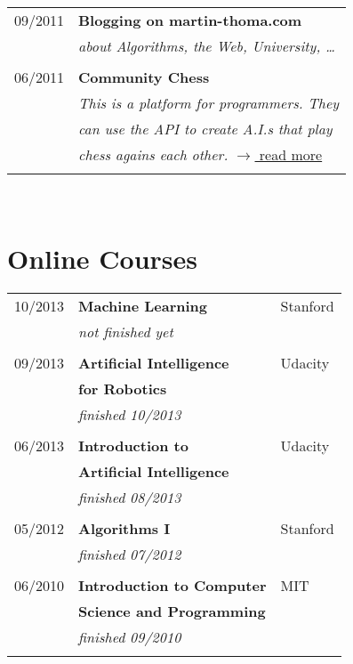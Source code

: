 \documentclass[a4paper,10pt]{article} %
\begin{document}
{\begin{minipage}[t]{0.44\textwidth}
\begin{tabular}{rl}
09/2011	 & \textbf{Blogging on martin-thoma.com}\\
& \textit{about Algorithms, the Web, University, \dots}\\ \\


06/2011	 & \textbf{Community Chess}\\
& \textit{This is a platform for programmers. They}\\
& \textit{can use the API to create A.I.s that play}\\
& \textit{chess agains each other. } \hfill \href{https://github.com/MartinThoma/community-chess}{$\rightarrow$ read more}\\\\
\end{tabular}\\[10pt]


\section{Online Courses} 

\begin{tabular}{rll}
10/2013	 & \textbf{Machine Learning}        & Stanford\\
    	 & \textit{not finished yet}        &\\\\
09/2013	 & \textbf{Artificial Intelligence} & Udacity\\
    	 & \textbf{for Robotics}            &\\
    	 & \textit{finished 10/2013}        &\\\\
06/2013	 & \textbf{Introduction to }        & Udacity\\
    	 & \textbf{Artificial Intelligence} &\\
    	 & \textit{finished 08/2013}        &\\\\
05/2012	 & \textbf{Algorithms I}            & Stanford\\
    	 & \textit{finished 07/2012}        &\\\\
06/2010	 & \textbf{Introduction to Computer}& MIT\\
    	 & \textbf{Science and Programming} &\\
    	 & \textit{finished 09/2010}        &\\\\
\end{tabular}\\[10pt]


\end{minipage}}
\end{document}

